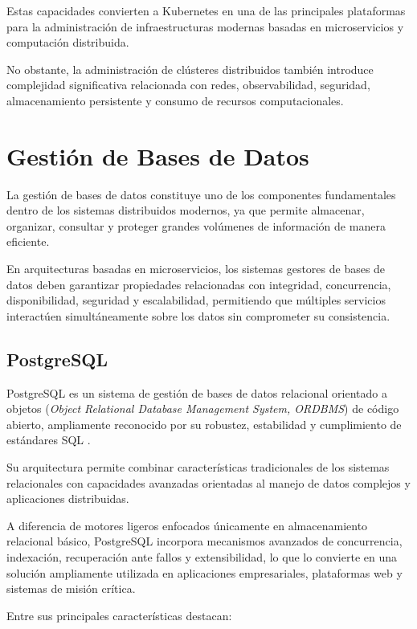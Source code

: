 Estas capacidades convierten a Kubernetes en una de las principales plataformas para la administración de infraestructuras modernas basadas en microservicios y computación distribuida.

No obstante, la administración de clústeres distribuidos también introduce complejidad significativa relacionada con redes, observabilidad, seguridad, almacenamiento persistente y consumo de recursos computacionales.

\section{Gestión de Bases de Datos}

La gestión de bases de datos constituye uno de los componentes fundamentales dentro de los sistemas distribuidos modernos, ya que permite almacenar, organizar, consultar y proteger grandes volúmenes de información de manera eficiente. 

En arquitecturas basadas en microservicios, los sistemas gestores de bases de datos deben garantizar propiedades relacionadas con integridad, concurrencia, disponibilidad, seguridad y escalabilidad, permitiendo que múltiples servicios interactúen simultáneamente sobre los datos sin comprometer su consistencia.

\subsection{PostgreSQL}

PostgreSQL es un sistema de gestión de bases de datos relacional orientado a objetos (\textit{Object Relational Database Management System, ORDBMS}) de código abierto, ampliamente reconocido por su robustez, estabilidad y cumplimiento de estándares SQL \cite{42}.

Su arquitectura permite combinar características tradicionales de los sistemas relacionales con capacidades avanzadas orientadas al manejo de datos complejos y aplicaciones distribuidas.

A diferencia de motores ligeros enfocados únicamente en almacenamiento relacional básico, PostgreSQL incorpora mecanismos avanzados de concurrencia, indexación, recuperación ante fallos y extensibilidad, lo que lo convierte en una solución ampliamente utilizada en aplicaciones empresariales, plataformas web y sistemas de misión crítica.

Entre sus principales características destacan:

